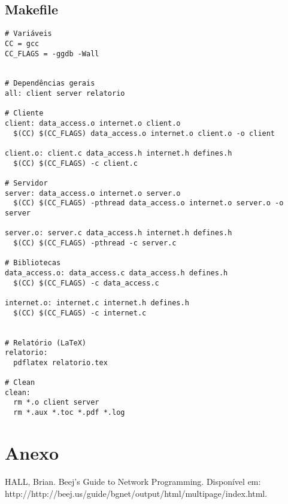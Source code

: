 \documentclass[11pt,twoside]{article}
\begin{document}
\subsection{Makefile}       %
\begin{verbatim}
# Variáveis
CC = gcc
CC_FLAGS = -ggdb -Wall


# Dependências gerais
all: client server relatorio

# Cliente
client: data_access.o internet.o client.o
  $(CC) $(CC_FLAGS) data_access.o internet.o client.o -o client

client.o: client.c data_access.h internet.h defines.h
  $(CC) $(CC_FLAGS) -c client.c

# Servidor
server: data_access.o internet.o server.o
  $(CC) $(CC_FLAGS) -pthread data_access.o internet.o server.o -o server

server.o: server.c data_access.h internet.h defines.h
  $(CC) $(CC_FLAGS) -pthread -c server.c

# Bibliotecas
data_access.o: data_access.c data_access.h defines.h
  $(CC) $(CC_FLAGS) -c data_access.c

internet.o: internet.c internet.h defines.h
  $(CC) $(CC_FLAGS) -c internet.c


# Relatório (LaTeX)
relatorio:
  pdflatex relatorio.tex

# Clean
clean:
  rm *.o client server
  rm *.aux *.toc *.pdf *.log
\end{verbatim}

\section{Anexo}

\begin{thebibliography}{99}
 HALL, Brian. Beej's Guide to Network Programming. Disponível em: http://http://beej.us/guide/bgnet/output/html/multipage/index.html.
\end{thebibliography}
\end{document}
